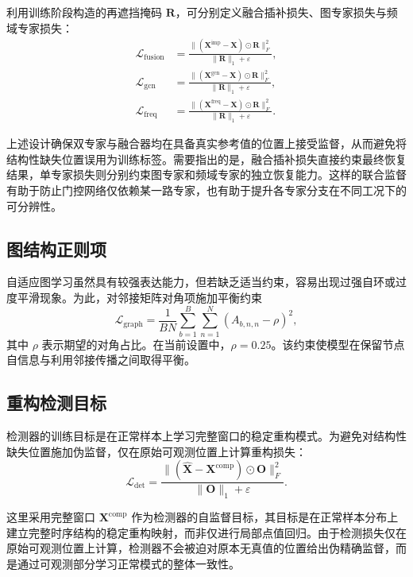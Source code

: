 利用训练阶段构造的再遮挡掩码 $\mathbf{R}$，可分别定义融合插补损失、图专家损失与频域专家损失：
\begin{align}
    \mathcal{L}_{\mathrm{fusion}}
    &=
    \frac{\|(\mathbf{X}^{\mathrm{imp}}-\mathbf{X}) \odot \mathbf{R}\|_F^2}{\|\mathbf{R}\|_1 + \varepsilon}, \\
    \mathcal{L}_{\mathrm{gcn}}
    &=
    \frac{\|(\mathbf{X}^{\mathrm{gcn}}-\mathbf{X}) \odot \mathbf{R}\|_F^2}{\|\mathbf{R}\|_1 + \varepsilon}, \\
    \mathcal{L}_{\mathrm{freq}}
    &=
    \frac{\|(\mathbf{X}^{\mathrm{freq}}-\mathbf{X}) \odot \mathbf{R}\|_F^2}{\|\mathbf{R}\|_1 + \varepsilon}.
\end{align}

上述设计确保双专家与融合器均在具备真实参考值的位置上接受监督，从而避免将结构性缺失位置误用为训练标签。需要指出的是，融合插补损失直接约束最终恢复结果，单专家损失则分别约束图专家和频域专家的独立恢复能力。这样的联合监督有助于防止门控网络仅依赖某一路专家，也有助于提升各专家分支在不同工况下的可分辨性。

\subsection{图结构正则项}

自适应图学习虽然具有较强表达能力，但若缺乏适当约束，容易出现过强自环或过度平滑现象。为此，对邻接矩阵对角项施加平衡约束
\begin{equation}
    \mathcal{L}_{\mathrm{graph}}
    =
    \frac{1}{BN}
    \sum_{b=1}^{B}\sum_{n=1}^{N}
    \left(
        A_{b,n,n} - \rho
    \right)^2,
\end{equation}
其中 $\rho$ 表示期望的对角占比。在当前设置中，$\rho=0.25$。该约束使模型在保留节点自信息与利用邻接传播之间取得平衡。

\subsection{重构检测目标}

检测器的训练目标是在正常样本上学习完整窗口的稳定重构模式。为避免对结构性缺失位置施加伪监督，仅在原始可观测位置上计算重构损失：
\begin{equation}
    \mathcal{L}_{\mathrm{det}}
    =
    \frac{\|(\hat{\mathbf{X}}-\mathbf{X}^{\mathrm{comp}}) \odot \mathbf{O}\|_F^2}{\|\mathbf{O}\|_1 + \varepsilon}.
\end{equation}

这里采用完整窗口 $\mathbf{X}^{\mathrm{comp}}$ 作为检测器的自监督目标，其目标是在正常样本分布上建立完整时序结构的稳定重构映射，而非仅进行局部点值回归。由于检测损失仅在原始可观测位置上计算，检测器不会被迫对原本无真值的位置给出伪精确监督，而是通过可观测部分学习正常模式的整体一致性。


